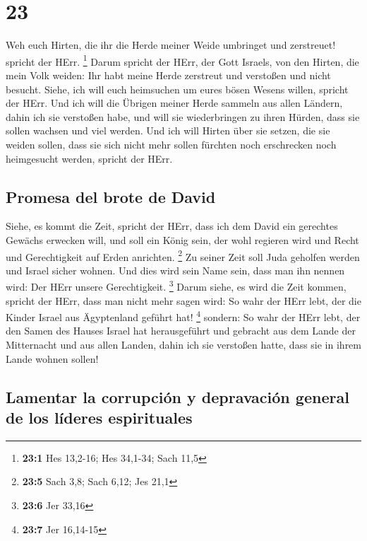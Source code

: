 \hypertarget{section-22}{%
\section{23}\label{section-22}}

 Weh euch Hirten, die ihr die Herde meiner Weide umbringet
und zerstreuet! spricht der HErr. \footnote{\textbf{23:1} Hes 13,2-16;
  Hes 34,1-34; Sach 11,5}  Darum spricht der HErr, der
Gott Israels, von den Hirten, die mein Volk weiden: Ihr habt meine Herde
zerstreut und verstoßen und nicht besucht. Siehe, ich will euch
heimsuchen um eures bösen Wesens willen, spricht der HErr.
 Und ich will die Übrigen meiner Herde sammeln aus allen
Ländern, dahin ich sie verstoßen habe, und will sie wiederbringen zu
ihren Hürden, dass sie sollen wachsen und viel werden. 
Und ich will Hirten über sie setzen, die sie weiden sollen, dass sie
sich nicht mehr sollen fürchten noch erschrecken noch heimgesucht
werden, spricht der HErr.

\hypertarget{promesa-del-brote-de-david}{%
\subsection{Promesa del brote de
David}\label{promesa-del-brote-de-david}}

 Siehe, es kommt die Zeit, spricht der HErr, dass ich dem
David ein gerechtes Gewächs erwecken will, und soll ein König sein, der
wohl regieren wird und Recht und Gerechtigkeit auf Erden anrichten.
\footnote{\textbf{23:5} Sach 3,8; Sach 6,12; Jes 21,1}  Zu
seiner Zeit soll Juda geholfen werden und Israel sicher wohnen. Und dies
wird sein Name sein, dass man ihn nennen wird: Der HErr unsere
Gerechtigkeit. \footnote{\textbf{23:6} Jer 33,16}  Darum
siehe, es wird die Zeit kommen, spricht der HErr, dass man nicht mehr
sagen wird: So wahr der HErr lebt, der die Kinder Israel aus Ägyptenland
geführt hat! \footnote{\textbf{23:7} Jer 16,14-15} 
sondern: So wahr der HErr lebt, der den Samen des Hauses Israel hat
herausgeführt und gebracht aus dem Lande der Mitternacht und aus allen
Landen, dahin ich sie verstoßen hatte, dass sie in ihrem Lande wohnen
sollen!

\hypertarget{lamentar-la-corrupciuxf3n-y-depravaciuxf3n-general-de-los-luxedderes-espirituales}{%
\subsection{Lamentar la corrupción y depravación general de los líderes
espirituales}\label{lamentar-la-corrupciuxf3n-y-depravaciuxf3n-general-de-los-luxedderes-espirituales}}

